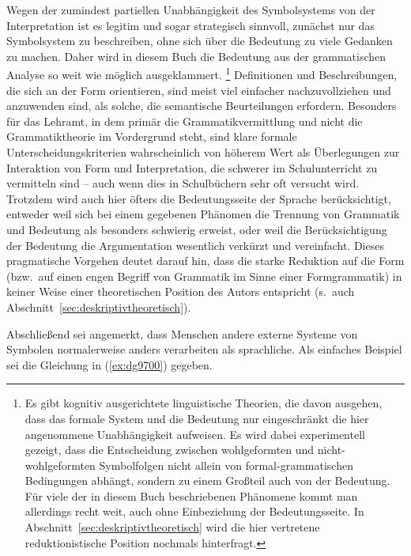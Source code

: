 Wegen der zumindest partiellen Unabhängigkeit des Symbolsystems von der Interpretation ist es legitim und sogar strategisch sinnvoll, zunächst nur das Symbolsystem zu beschreiben, ohne sich über die Bedeutung zu viele Gedanken zu machen.
Daher wird in diesem Buch die Bedeutung aus der grammatischen Analyse so weit wie möglich ausgeklammert.%
\footnote{Es gibt kognitiv ausgerichtete linguistische Theorien, die davon ausgehen, dass das formale System und die Bedeutung nur eingeschränkt die hier angenommene Unabhängigkeit aufweisen.
Es wird dabei \zB experimentell gezeigt, dass die Entscheidung zwischen wohlgeformten und nicht-wohlgeformten Symbolfolgen nicht allein von formal-grammatischen Bedingungen abhängt, sondern zu einem Großteil auch von der Bedeutung.
Für viele der in diesem Buch beschriebenen Phänomene kommt man allerdings recht weit, auch ohne Einbeziehung der Bedeutungsseite.
In Abschnitt~\ref{sec:deskriptivtheoretisch} wird die hier vertretene reduktionistische Position nochmals hinterfragt.}
Definitionen und Beschreibungen, die sich an der Form orientieren, sind meist viel einfacher nachzuvollziehen und anzuwenden sind, als solche, die semantische Beurteilungen erfordern.
Besonders für das Lehramt, in dem primär die Grammatikvermittlung und nicht die Grammatiktheorie im Vordergrund steht, sind klare formale Unterscheidungskriterien wahrscheinlich von höherem Wert als Überlegungen zur Interaktion von Form und Interpretation, die schwerer im Schulunterricht zu vermitteln sind -- auch wenn dies in Schulbüchern sehr oft versucht wird.
Trotzdem wird auch hier öfters die Bedeutungsseite der Sprache berücksichtigt, entweder weil sich bei einem gegebenen Phänomen die Trennung von Grammatik und Bedeutung als besonders schwierig erweist, oder weil die Berücksichtigung der Bedeutung die Argumentation wesentlich verkürzt und vereinfacht.
Dieses pragmatische Vorgehen deutet darauf hin, dass die starke Reduktion auf die Form (bzw.\ auf einen engen Begriff von Grammatik im Sinne einer Formgrammatik) in keiner Weise einer theoretischen Position des Autors entspricht (s.\ auch Abschnitt~\ref{sec:deskriptivtheoretisch}).

Abschließend sei angemerkt, dass Menschen andere externe Systeme von Symbolen normalerweise anders verarbeiten als sprachliche.
Als einfaches Beispiel sei die Gleichung in (\ref{ex:dg9700}) gegeben.

\begin{exe}
\end{exe}


